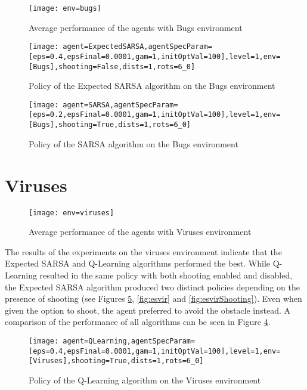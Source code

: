 \begin{figure}[h]
    \centering
    \texttt{[image: env=bugs]}
    \caption{Average performance of the agents with Bugs environment}
    \label{fig:avgbugs}
\end{figure}

\begin{figure}[h]
    \centering
    \texttt{[image: agent=ExpectedSARSA,agentSpecParam=[eps=0.4,epsFinal=0.0001,gam=1,initOptVal=100],level=1,env=[Bugs],shooting=False,dists=1,rots=6\_0]}
    \caption{Policy of the Expected SARSA algorithm on the Bugs environment}
    \label{fig:polexps}
\end{figure}

\begin{figure}[h]
    \centering
    \texttt{[image: agent=SARSA,agentSpecParam=[eps=0.2,epsFinal=0.0001,gam=1,initOptVal=100],level=1,env=[Bugs],shooting=True,dists=1,rots=6\_0]}
    \caption{Policy of the SARSA algorithm on the Bugs environment}
    \label{fig:pols}
\end{figure}

\section{Viruses}
\begin{figure}[h]
    \centering
    \texttt{[image: env=viruses]}
    \caption{Average performance of the agents with Viruses environment}
    \label{fig:avgviruses}
\end{figure}

The results of the experiments on the viruses environment indicate that the Expected SARSA and Q-Learning algorithms performed the best. While Q-Learning resulted in the same policy with both shooting enabled and disabled, the Expected SARSA algorithm produced two distinct policies depending on the presence of shooting (see Figures \ref{fig:qvir}, \ref{fig:esvir} and \ref{fig:esvirShooting}). Even when given the option to shoot, the agent preferred to avoid the obstacle instead. A comparison of the performance of all algorithms can be seen in Figure \ref{fig:avgviruses}.


\begin{figure}[h]
    \centering
    \texttt{[image: agent=QLearning,agentSpecParam=[eps=0.4,epsFinal=0.0001,gam=1,initOptVal=100],level=1,env=[Viruses],shooting=True,dists=1,rots=6\_0]}
    \caption{Policy of the Q-Learning algorithm on the Viruses environment}
    \label{fig:qvir}
\end{figure}

